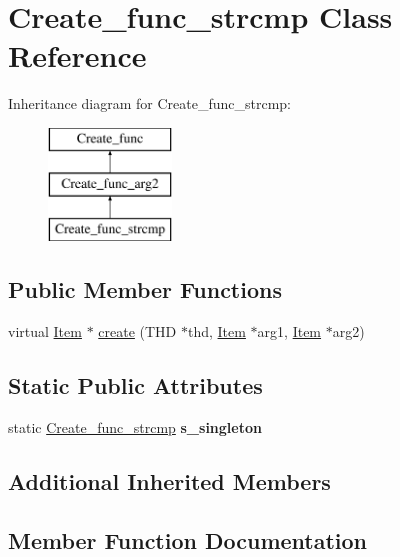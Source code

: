 \hypertarget{classCreate__func__strcmp}{}\section{Create\+\_\+func\+\_\+strcmp Class Reference}
\label{classCreate__func__strcmp}
Inheritance diagram for Create\+\_\+func\+\_\+strcmp\+:\begin{figure}[H]
\begin{center}
\leavevmode
\includegraphics[height=3.000000cm]{classCreate__func__strcmp}
\end{center}
\end{figure}
\subsection*{Public Member Functions}
\begin{DoxyCompactItemize}
\item 
virtual \mbox{\hyperlink{classItem}{Item}} $\ast$ \mbox{\hyperlink{classCreate__func__strcmp_a59e7e2cce2e114505969e132c8f15f11}{create}} (T\+HD $\ast$thd, \mbox{\hyperlink{classItem}{Item}} $\ast$arg1, \mbox{\hyperlink{classItem}{Item}} $\ast$arg2)
\end{DoxyCompactItemize}
\subsection*{Static Public Attributes}
\begin{DoxyCompactItemize}
\item 
\mbox{\label{classCreate__func__strcmp_a9716289618a311ec66b123cf42ac1b8b}} 
static \mbox{\hyperlink{classCreate__func__strcmp}{Create\+\_\+func\+\_\+strcmp}} {\bfseries s\+\_\+singleton}
\end{DoxyCompactItemize}
\subsection*{Additional Inherited Members}


\subsection{Member Function Documentation}
\mbox{\label{classCreate__func__strcmp_a59e7e2cce2e114505969e132c8f15f11}} 
